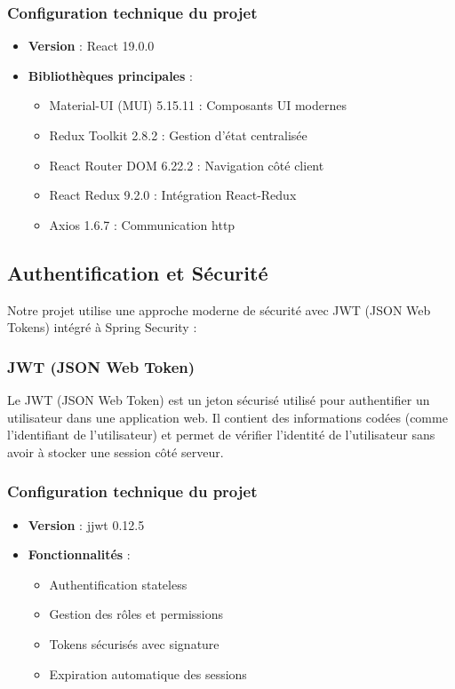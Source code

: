\documentclass[12pt,a4paper]{report}
\begin{document}
\subsubsection{Configuration technique du projet}

\begin{itemize}
\item \textbf{Version} : React 19.0.0
\item \textbf{Bibliothèques principales} :
  \begin{itemize}
  \item Material-UI (MUI) 5.15.11 : Composants UI modernes
  \item Redux Toolkit 2.8.2 : Gestion d'état centralisée
  \item React Router DOM 6.22.2 : Navigation côté client
  \item React Redux 9.2.0 : Intégration React-Redux
  \item Axios 1.6.7 : Communication http
  \end{itemize}
\end{itemize}

\subsection{Authentification et Sécurité}

Notre projet utilise une approche moderne de sécurité avec JWT (JSON Web Tokens) intégré à Spring Security :

\subsubsection{JWT (JSON Web Token)}

Le JWT (JSON Web Token) est un jeton sécurisé utilisé pour authentifier un utilisateur dans une application web. Il contient des informations codées (comme l'identifiant de l'utilisateur) et permet de vérifier l'identité de l'utilisateur sans avoir à stocker une session côté serveur.

\subsubsection{Configuration technique du projet}

\begin{itemize}
\item \textbf{Version} : jjwt 0.12.5
\item \textbf{Fonctionnalités} :
  \begin{itemize}
  \item Authentification stateless
  \item Gestion des rôles et permissions
  \item Tokens sécurisés avec signature
  \item Expiration automatique des sessions
  \end{itemize}
\end{itemize}
\end{document}
